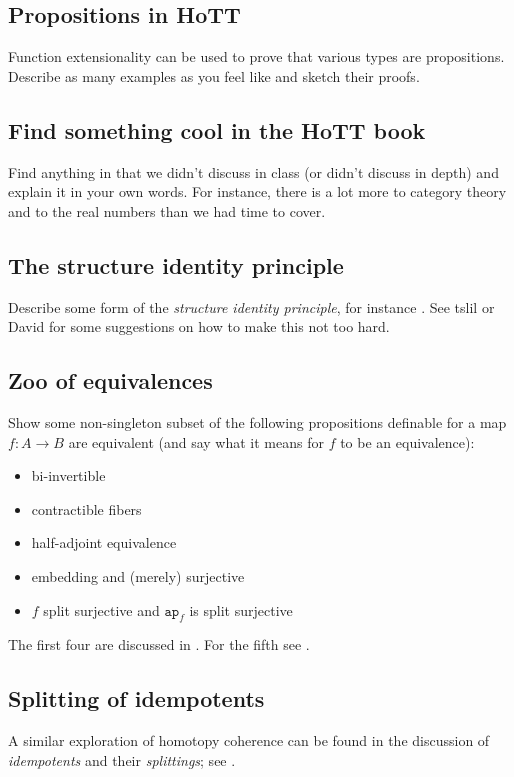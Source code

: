 \documentclass{amsart}
\theoremstyle{definition}
\theoremstyle{remark}
\numberwithin{equation}{section}
\begin{document}
\subsection*{Propositions in HoTT} Function extensionality can be used to prove that various types are propositions. Describe as many examples as you feel like and sketch their proofs.

\subsection*{Find something cool in the HoTT book} Find anything in \cite{book-hott} that we didn't discuss in class (or didn't discuss in depth) and explain it in your own words. For instance, there is a lot more to category theory and to the real numbers than we had time to cover.

\subsection*{The structure identity principle}

Describe some form of the \emph{structure identity principle}, for instance \cite[\S 9.8]{book-hott}. See tslil or David for some suggestions on how to make this not too hard.

\subsection*{Zoo of equivalences} Show some non-singleton subset of the following propositions definable for a map $f \colon A \to B$ are equivalent (and say what it means for $f$ to be an equivalence):
\begin{itemize}
\item bi-invertible
\item contractible fibers
\item half-adjoint equivalence
\item embedding and (merely) surjective
\item $f$ split surjective and $\texttt{ap}_f$ is split surjective
\end{itemize}

The first four are discussed in \cite{book-hott}. For the fifth see \cite{RSS}.

\subsection*{Splitting of idempotents}

A similar exploration of homotopy coherence can be found in the discussion of \emph{idempotents} and their \emph{splittings}; see \cite{idempotents}.
\end{document}
